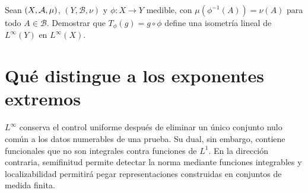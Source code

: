 \begin{ejercicio}\label{ej:v2-l23-7}
Sean $(X,\mathcal A,\mu)$, $(Y,\mathcal B,\nu)$ y $\phi:X\to Y$ medible, con $\mu(\phi^{-1}(A))=\nu(A)$ para todo $A\in\mathcal B$. Demostrar que $T_\phi(g)=g\circ\phi$ define una isometría lineal de $L^\infty(Y)$ en $L^\infty(X)$.
\end{ejercicio}

\section{Qué distingue a los exponentes extremos}
$L^\infty$ conserva el control uniforme después de eliminar un único conjunto nulo común a los datos numerables de una prueba. Su dual, sin embargo, contiene funcionales que no son integrales contra funciones de $L^1$. En la dirección contraria, semifinitud permite detectar la norma mediante funciones integrables y localizabilidad permitirá pegar representaciones construidas en conjuntos de medida finita.
